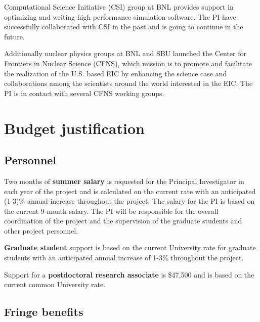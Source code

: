 \documentclass{DOEproposal}
\begin{document}
		Computational Science Initiative (CSI) group at BNL 
		provides support in optimizing and writing high performance 
		simulation software. The PI have successfully collaborated with 
		CSI in the past and is going to continue in the future. 

		Additionally nuclear physics  groups at BNL and SBU launched 
		the Center for Frontiers in Nuclear Science (CFNS), which mission
		is to promote and facilitate the realization of the U.S. based 
		EIC by enhancing the science case and collaborations among the 
		scientists around the world interested in the EIC. The PI is in contact
		with several CFNS working groups.  

\section{Budget justification}
        \label{sec:budget}
		\vspace{1.2em}			

		\subsection*{Personnel} 
		\vspace{0.5em}			

		\noindent
		Two months of {\bf summer salary} is requested for the Principal Investigator in each year of the project and
		is calculated on the current rate with an anticipated (1-3)\% annual increase throughout the project.  
		The salary for the PI is based on the current 9-month salary. 
		The PI will be responsible for the overall coordination of the project and the supervision of the graduate 
		students and other project personnel. 
	\vspace{0.5em}		

	\noindent
	{\bf Graduate student} support is based on the current University rate for graduate students with an anticipated 
		annual increase of 1-3\% throughout the project. 

	\vspace{0.5em}		

	\noindent
	Support for a {\bf postdoctoral research associate} is  \$47,500 and  is based on the current common University rate.
		\vspace{1.2em}			

		\subsection*{Fringe benefits} 
		\vspace{0.5em}			
	
\end{document}
